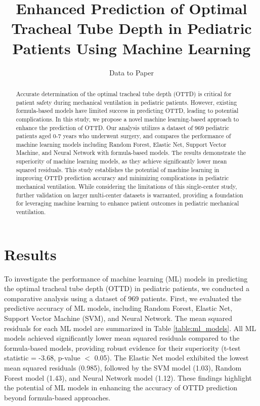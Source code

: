 \documentclass[11pt]{article}
\title{Enhanced Prediction of Optimal Tracheal Tube Depth in Pediatric Patients Using Machine Learning}
\author{Data to Paper}
\begin{document}
\maketitle
\begin{abstract}
Accurate determination of the optimal tracheal tube depth (OTTD) is critical for patient safety during mechanical ventilation in pediatric patients. However, existing formula-based models have limited success in predicting OTTD, leading to potential complications. In this study, we propose a novel machine learning-based approach to enhance the prediction of OTTD. Our analysis utilizes a dataset of 969 pediatric patients aged 0-7 years who underwent surgery, and compares the performance of machine learning models including Random Forest, Elastic Net, Support Vector Machine, and Neural Network with formula-based models. The results demonstrate the superiority of machine learning models, as they achieve significantly lower mean squared residuals. This study establishes the potential of machine learning in improving OTTD prediction accuracy and minimizing complications in pediatric mechanical ventilation. While considering the limitations of this single-center study, further validation on larger multi-center datasets is warranted, providing a foundation for leveraging machine learning to enhance patient outcomes in pediatric mechanical ventilation.
\end{abstract}
\section*{Results}

To investigate the performance of machine learning (ML) models in predicting the optimal tracheal tube depth (OTTD) in pediatric patients, we conducted a comparative analysis using a dataset of 969 patients. First, we evaluated the predictive accuracy of ML models, including Random Forest, Elastic Net, Support Vector Machine (SVM), and Neural Network. The mean squared residuals for each ML model are summarized in Table \ref{table:ml_models}. All ML models achieved significantly lower mean squared residuals compared to the formula-based models, providing robust evidence for their superiority (t-test statistic = -3.68, p-value $<$ 0.05). The Elastic Net model exhibited the lowest mean squared residuals (0.985), followed by the SVM model (1.03), Random Forest model (1.43), and Neural Network model (1.12). These findings highlight the potential of ML models in enhancing the accuracy of OTTD prediction beyond formula-based approaches.
\end{document}
